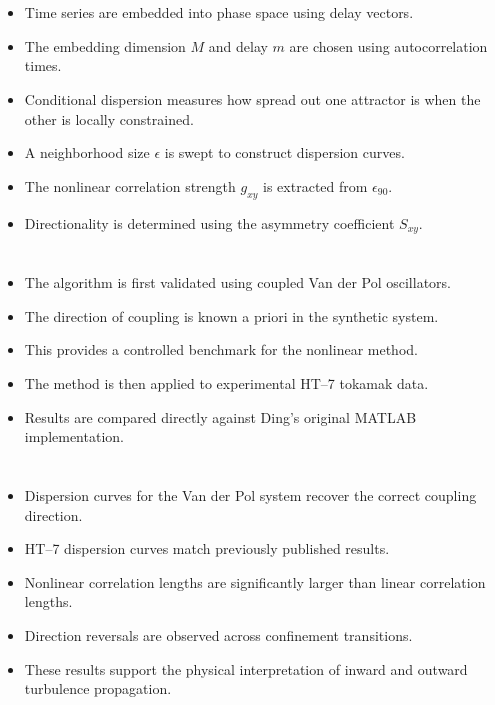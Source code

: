 \documentclass{article}
\begin{document}
\section{}

\begin{itemize}
\item Time series are embedded into phase space using delay vectors.
\item The embedding dimension $M$ and delay $m$ are chosen using autocorrelation times.
\item Conditional dispersion measures how spread out one attractor is when the other is locally constrained.
\item A neighborhood size $\epsilon$ is swept to construct dispersion curves.
\item The nonlinear correlation strength $g_{xy}$ is extracted from $\epsilon_{90}$.
\item Directionality is determined using the asymmetry coefficient $S_{xy}$.
\end{itemize}

\section{}

\begin{itemize}
\item The algorithm is first validated using coupled Van der Pol oscillators.
\item The direction of coupling is known a priori in the synthetic system.
\item This provides a controlled benchmark for the nonlinear method.
\item The method is then applied to experimental HT--7 tokamak data.
\item Results are compared directly against Ding’s original MATLAB implementation.
\end{itemize}
\section{}

\begin{itemize}
\item Dispersion curves for the Van der Pol system recover the correct coupling direction.
\item HT--7 dispersion curves match previously published results.
\item Nonlinear correlation lengths are significantly larger than linear correlation lengths.
\item Direction reversals are observed across confinement transitions.
\item These results support the physical interpretation of inward and outward turbulence propagation.
\end{itemize}
\end{document}
